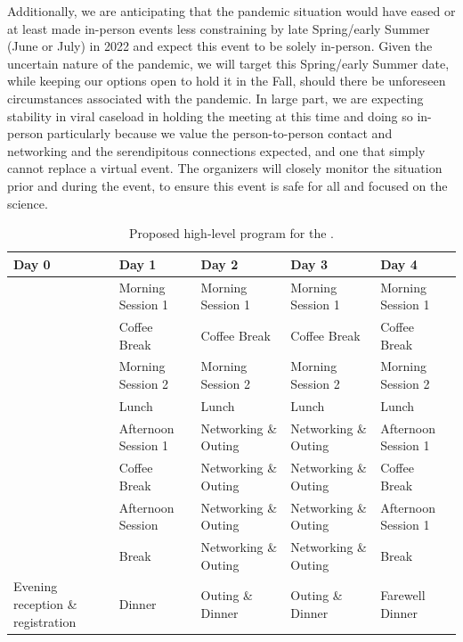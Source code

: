 Additionally, we are anticipating that the pandemic situation would
have eased or at least made in-person events less constraining by late
Spring/early Summer (June or July) in 2022 and expect this event to be
solely in-person. Given the uncertain nature of the pandemic, we will
target this Spring/early Summer date, while keeping our options open
to hold it in the Fall, should there be unforeseen circumstances
associated with the pandemic. In large part, we are expecting
stability in viral caseload in holding the meeting at this time and
doing so in-person particularly because we value the person-to-person
contact and networking and the serendipitous connections expected, and
one that simply cannot replace a virtual event. The organizers will
closely monitor the situation prior and during the event, to ensure
this event is safe for all and focused on the science.

\begin{table}[!t]
  \centering
  \begin{tabular}{|p{2.5cm}|p{2.5cm}|p{2.5cm}|p{2.5cm}|p{2.5cm}|}
    \hline 
    \rowcolor{Gray}
    \bfseries Day 0& \bfseries Day 1&\bfseries Day 2 &\bfseries Day 3 &\bfseries Day 4\\
    \hline
                   &Morning Session 1&Morning Session 1&Morning Session 1&Morning Session 1\\
    \hline
                   &Coffee Break&Coffee Break&Coffee Break&Coffee Break\\
    \hline    
                   &Morning Session 2&Morning Session 2&Morning Session 2&Morning Session 2\\
    \hline
                   &Lunch&Lunch&Lunch&Lunch\\
    \hline
                   &Afternoon Session 1&Networking \& Outing&Networking \& Outing&Afternoon Session 1\\
    \hline
                   &Coffee Break&Networking \& Outing&Networking \& Outing&Coffee Break\\
    \hline
                   &Afternoon Session &Networking \& Outing&Networking \& Outing&Afternoon Session 1\\
    \hline
                   &Break&Networking \& Outing&Networking \& Outing&Break\\
    \hline
    Evening reception \& registration&Dinner&Outing \& Dinner&Outing \&
                                                               Dinner&Farewell Dinner\\
    \hline        
  \end{tabular}
  \caption{Proposed high-level program for the \sympe.}
  \label{tab:symp}
\end{table}

